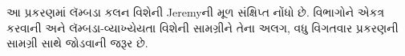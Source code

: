 \documentclass[../../../include/open-logic-chapter]{subfiles}
\begin{document}

\begin{editorial}
આ પ્રકરણમાં લૅમ્બડા કલન વિશેની Jeremyની મૂળ સંક્ષિપ્ત નોંધો છે.
વિભાગોને એકત્ર કરવાની અને લૅમ્બડા-વ્યાખ્યેયતા વિશેની સામગ્રીને
તેના અલગ, વધુ વિગતવાર પ્રકરણની સામગ્રી સાથે જોડવાની જરૂર છે.
\end{editorial}














\OLEndChapterHook
\end{document}

